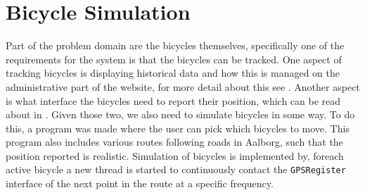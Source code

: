 \section{Bicycle Simulation}
Part of the problem domain are the bicycles themselves, specifically one of the requirements for the system is that the bicycles can be tracked.
One aspect of tracking bicycles is displaying historical data and how this is managed on the administrative part of the website, for more detail about this see .
Another aspect is what interface the bicycles need to report their position, which can be read about in . 
Given those two, we also need to simulate bicycles in some way.
To do this, a program was made where the user can pick which bicycles to move. 
This program also includes various routes following roads in Aalborg, such that the position reported is realistic.
Simulation of bicycles is implemented by, foreach active bicycle a new thread is started to continuously contact the \texttt{GPSRegister} interface of the next point in the route at a specific frequency.